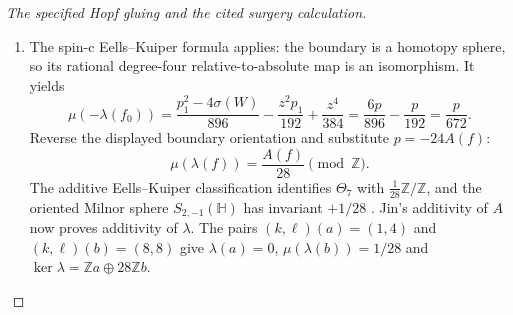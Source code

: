 \begin{proof}[The specified Hopf gluing and the cited surgery calculation]
\begin{enumerate}[label=\arabic*.]
This is Jiang's disc-bundle and four-handle construction, with the exact
substitution
\[
 [N,t]=(N_{f_0},x),\qquad
 (k,p,\varepsilon,\delta)=(0,\ell(f)-4k(f),0,0),
\]
where $\varepsilon$ and $\delta$ denote the source's second
Stiefel--Whitney and Kirby--Siebenmann indicators. The hypotheses hold
because $N_{f_0}$ is smooth and spin and $x^2=0$. We use the calculated
intersection and characteristic numbers from
\cite[Lemma~3.5, Case~2, pp.~13--15]{Jiang2014}.
In its alternative description the Hopf-disc neighbourhood is replaced
by $\mathbb CP^2\times D^4$. For the projective-plane cycle and the
cycle from $H_4(N_{f_0})$ the matrix is
\[
 Q_W=\begin{pmatrix}0&1\\1&0\end{pmatrix}. \tag{P3F.22.3}
\]
The characteristic class $z$ extends $x$ and is positive on the
projective line. With the source's relative classes $u,v$ and natural
map $j$, its restrictions are $z^2=(1,0)$ and $p_1=(3,p)$, equivalently
$z^2=jv$ and $p_1=p\,ju+3jv$. The cited calculation therefore gives
\[
 \sigma(W)=0,\qquad p_1^2[W,\partial W]=6p,\qquad
 z^2p_1[W,\partial W]=p,\qquad z^4[W,\partial W]=0.
 \tag{P3F.22.4}
\]

\item The spin-c Eells--Kuiper formula
\cite[Section~3.1(v), pp.~5--6]{Jiang2014} applies: the boundary is a
homotopy sphere, so its rational degree-four relative-to-absolute map
is an isomorphism. It yields
\[
 \mu(-\lambda(f_0))=
 \frac{p_1^2-4\sigma(W)}{896}
 -\frac{z^2p_1}{192}+\frac{z^4}{384}
 =\frac{6p}{896}-\frac p{192}=\frac p{672}.
\]
Reverse the displayed boundary orientation and substitute $p=-24A(f)$:
\[
 \mu(\lambda(f))=\frac{A(f)}{28}\pmod{\mathbb Z}. \tag{P3F.22.1}
\]
The additive Eells--Kuiper classification identifies $\Theta_7$ with
$\frac1{28}\mathbb Z/\mathbb Z$, and the oriented Milnor sphere
$S_{2,-1}(\mathbb H)$ has invariant $+1/28$
\cite[Sections~2--3, pp.~67--69]{Davis1982}.
Jin's additivity of $A$ now proves additivity of $\lambda$. The pairs
$(k,\ell)(a)=(1,4)$ and $(k,\ell)(b)=(8,8)$ give
$\lambda(a)=0$, $\mu(\lambda(b))=1/28$ and
$\ker\lambda=\mathbb Za\oplus28\mathbb Zb$.
\end{enumerate}
\end{proof}
